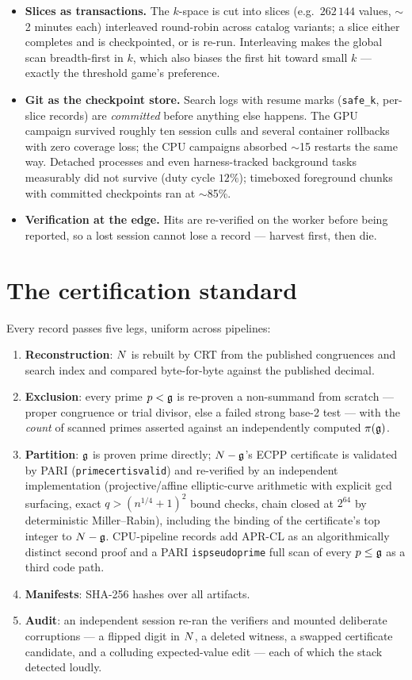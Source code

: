 \begin{itemize}
\item \textbf{Slices as transactions.} The $k$-space is cut into slices
(e.g.\ $262\,144$ values, $\sim$2 minutes each) interleaved round-robin
across catalog variants; a slice either completes and is checkpointed,
or is re-run. Interleaving makes the global scan breadth-first in $k$,
which also biases the first hit toward small $k$ --- exactly the
threshold game's preference.
\item \textbf{Git as the checkpoint store.} Search logs with resume
marks (\texttt{safe\_k}, per-slice records) are \emph{committed} before
anything else happens. The GPU campaign survived roughly ten session
culls and several container rollbacks with zero coverage loss; the CPU
campaigns absorbed $\sim$15 restarts the same way. Detached processes
and even harness-tracked background tasks measurably did not survive
(duty cycle $12\%$); timeboxed foreground chunks with committed
checkpoints ran at $\sim$85\%.
\item \textbf{Verification at the edge.} Hits are re-verified on the
worker before being reported, so a lost session cannot lose a record ---
harvest first, then die.
\end{itemize}

\section{The certification standard}\label{sec:certification}

Every record passes five legs, uniform across pipelines:
\begin{enumerate}
\item \textbf{Reconstruction}: $N$ is rebuilt by CRT from the
published congruences and search index and compared byte-for-byte
against the published decimal.
\item \textbf{Exclusion}: every prime $p<\mathfrak{g}$ is re-proven a non-summand
from scratch --- proper congruence or trial divisor, else a failed
strong base-2 test --- with the \emph{count} of scanned primes asserted
against an independently computed $\pi(\mathfrak{g})$.
\item \textbf{Partition}: $\mathfrak{g}$ is proven prime directly; $N-\mathfrak{g}$'s ECPP
certificate is validated by PARI (\texttt{primecertisvalid}) and
re-verified by an independent implementation
(projective/affine elliptic-curve arithmetic with explicit gcd
surfacing, exact $q>(n^{1/4}+1)^2$ bound checks, chain closed at
$2^{64}$ by deterministic Miller--Rabin), including the binding of the
certificate's top integer to $N-\mathfrak{g}$. CPU-pipeline records add APR-CL
as an algorithmically distinct second proof and a PARI
\texttt{ispseudoprime} full scan of every $p\le\mathfrak{g}$ as a third code
path.
\item \textbf{Manifests}: SHA-256 hashes over all artifacts.
\item \textbf{Audit}: an independent session re-ran the verifiers and
mounted deliberate corruptions --- a flipped digit in $N$, a deleted
witness, a swapped certificate candidate, and a colluding
expected-value edit --- each of which the stack detected loudly.
\end{enumerate}


